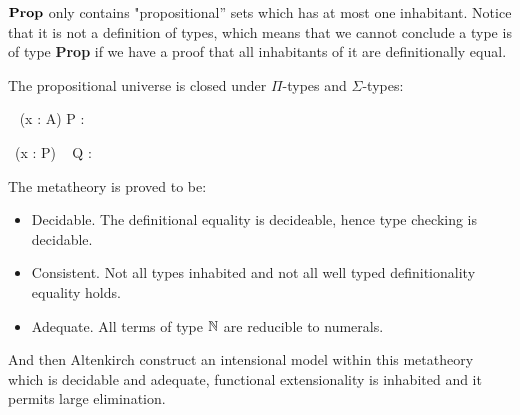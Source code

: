 




 $\operatorname{\mathbf{Prop}}$ only contains "propositional'' sets which has at most one
inhabitant. Notice that it is not a definition of types, which means
that we cannot conclude a type is of type \textbf{Prop} if we have a
proof that all inhabitants of it are definitionally equal.

The propositional universe is closed under $\Pi$-types and $\Sigma$-types:



{\Gamma \vdash \Pi~ (x : A) \to P : \Prop}



{\Gamma \vdash \Sigma ~(x : P) ~ Q : \Prop}


The metatheory is proved {\cite{alti:lics99}} to be:

\begin{itemize}
\item Decidable. The definitional equality is decideable, hence type checking is decidable.

\item Consistent. Not all types inhabited and not all well typed definitionality equality holds. 

\item Adequate. All terms of type $\mathbb{N}$ are reducible to numerals.
\end{itemize}


And then Altenkirch construct an intensional model within this metatheory which is decidable and adequate, functional extensionality is inhabited and it permits large elimination. 





